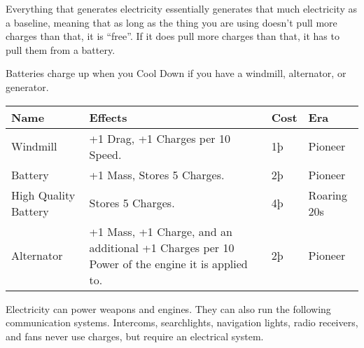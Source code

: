\documentclass{article}
\begin{document}
Everything that generates electricity essentially generates that much
electricity as a baseline, meaning that as long as the thing you are
using doesn't pull more charges than that, it is ``free''. If it does
pull more charges than that, it has to pull them from a battery.

\hfill\break
Batteries charge up when you Cool Down if you have a windmill,
alternator, or generator.

\begin{tabular}{|l|l|l|l|}
  \hline
  Name                                  & Effects                                                 & Cost    & Era         \\\hline
  Windmill                              & +1 Drag, +1 Charges per 10 Speed.                       & 1þ      & Pioneer     \\\hline
  Battery                               & +1 Mass, Stores 5 Charges.                              & 2þ      & Pioneer     \\\hline
  High Quality Battery                  & Stores 5 Charges.                                       & 4þ      & Roaring 20s \\\hline
  Alternator                            & +1 Mass, +1 Charge, and an additional +1 Charges per 10
  Power of the engine it is applied to. & 2þ                                                      & Pioneer               \\\hline
\end{tabular}

Electricity can power weapons and engines. They can also run the
following communication systems. Intercoms, searchlights, navigation
lights, radio receivers, and fans never use charges, but require an
electrical system.
\end{document}
